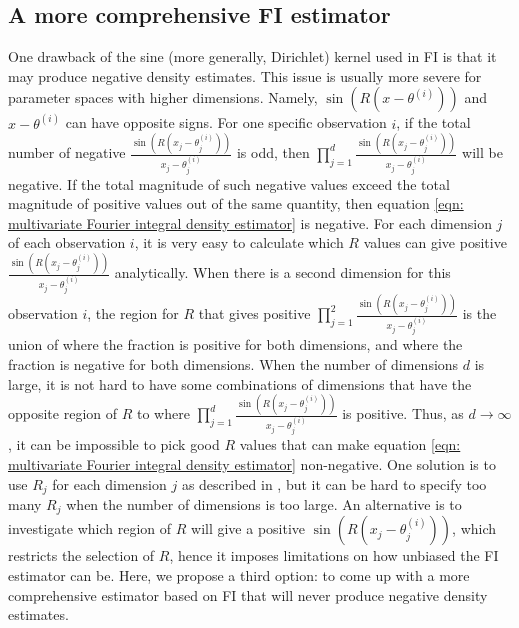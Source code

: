 \documentclass[%
 reprint,
 amsmath,amssymb,
 aps,
]{revtex4-2}
\begin{document}
\subsection{\label{subsec:comprehensive FI} A more comprehensive FI estimator}

One drawback of the sine (more generally, Dirichlet) kernel used in FI is that it may produce negative density estimates. This issue is usually more severe for parameter spaces with higher dimensions. Namely, $\sin(R(x - \theta^{(i)}))$ and $x - \theta^{(i)}$ can have opposite signs. For one specific observation $i$, if the total number of negative $\displaystyle \frac{\sin(R(x_j - \theta_j^{(i)}))}{x_j - \theta_j^{(i)}}$ is odd, then $\displaystyle \prod_{j = 1}^d \frac{\sin(R(x_j - \theta_j^{(i)}))}{x_j - \theta_j^{(i)}}$ will be negative. If the total magnitude of such negative values exceed the total magnitude of positive values out of the same quantity, then equation \eqref{eqn: multivariate Fourier integral density estimator} is negative. For each dimension $j$ of each observation $i$, it is very easy to calculate which $R$ values can give positive $\displaystyle \frac{\sin(R(x_j - \theta_j^{(i)}))}{x_j - \theta_j^{(i)}}$ analytically. When there is a second dimension for this observation $i$, the region for $R$ that gives positive $\displaystyle \prod_{j = 1}^2 \frac{\sin(R(x_j - \theta_j^{(i)}))}{x_j - \theta_j^{(i)}}$ is the union of where the fraction is positive for both dimensions, and where the fraction is negative for both dimensions. When the number of dimensions $d$ is large, it is not hard to have some combinations of dimensions that have the opposite region of $R$ to where $\displaystyle \prod_{j = 1}^d \frac{\sin(R(x_j - \theta_j^{(i)}))}{x_j - \theta_j^{(i)}}$ is positive. Thus, as $d \to \infty$, it can be impossible to pick good $R$ values that can make equation \eqref{eqn: multivariate Fourier integral density estimator} non-negative. One solution is to use $R_j$ for each dimension $j$ as described in \cite{rotiroti2022computing}, but it can be hard to specify too many $R_j$ when the number of dimensions is too large. An alternative is to investigate which region of $R$ will give a positive $\sin(R(x_j - \theta_j^{(i)}))$, which restricts the selection of $R$, hence it imposes limitations on how unbiased the FI estimator can be. Here, we propose a third option: to come up with a more comprehensive estimator based on FI that will never produce negative density estimates.
\end{document}
